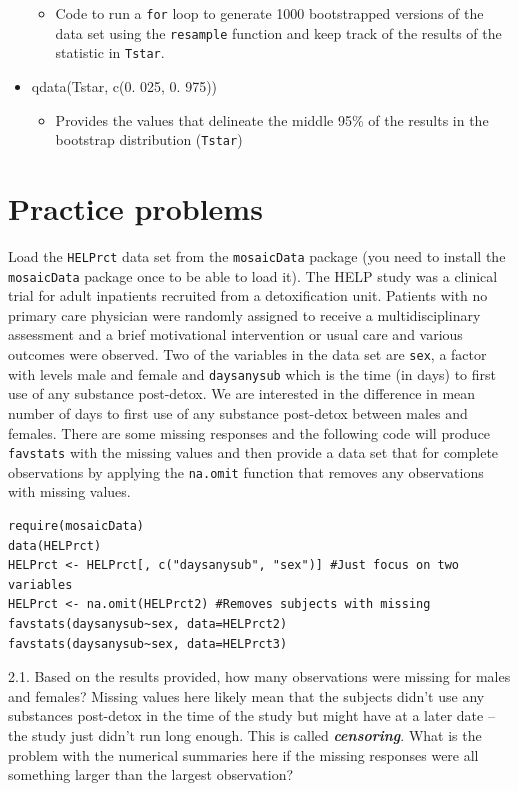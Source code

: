 \documentclass[]{book}
\providecommand{\tightlist}{%
  \setlength{\itemsep}{0pt}\setlength{\parskip}{0pt}}
\begin{document}
\begin{itemize}
  \begin{itemize}
  \tightlist
  \item
    Code to run a \texttt{for} loop to generate 1000 bootstrapped
    versions of the data set using the \texttt{resample} function and
    keep track of the results of the statistic in \texttt{Tstar}.
  \end{itemize}
\item
  qdata(Tstar, c(0. 025, 0. 975))

  \begin{itemize}
  \tightlist
  \item
    Provides the values that delineate the middle 95\% of the results in
    the bootstrap distribution (\texttt{Tstar})
  \end{itemize}
\end{itemize}

\section{Practice problems}\label{section2-12}

Load the \texttt{HELPrct} data set from the \texttt{mosaicData} package
(you need to install the \texttt{mosaicData} package once to be able to
load it). The HELP study was a clinical trial for adult inpatients
recruited from a detoxification unit. Patients with no primary care
physician were randomly assigned to receive a multidisciplinary
assessment and a brief motivational intervention or usual care and
various outcomes were observed. Two of the variables in the data set are
\texttt{sex}, a factor with levels male and female and
\texttt{daysanysub} which is the time (in days) to first use of any
substance post-detox. We are interested in the difference in mean number
of days to first use of any substance post-detox between males and
females. There are some missing responses and the following code will
produce \texttt{favstats} with the missing values and then provide a
data set that for complete observations by applying the \texttt{na.omit}
function that removes any observations with missing values.

\begin{verbatim}
require(mosaicData)
data(HELPrct)
HELPrct <- HELPrct[, c("daysanysub", "sex")] #Just focus on two variables
HELPrct <- na.omit(HELPrct2) #Removes subjects with missing
favstats(daysanysub~sex, data=HELPrct2)
favstats(daysanysub~sex, data=HELPrct3)
\end{verbatim}

2.1. Based on the results provided, how many observations were missing
for males and females? Missing values here likely mean that the subjects
didn't use any substances post-detox in the time of the study but might
have at a later date -- the study just didn't run long enough. This is
called \textbf{\emph{censoring}}. What is the problem with the numerical
summaries here if the missing responses were all something larger than
the largest observation?
\end{document}
